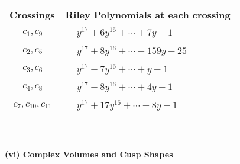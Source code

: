 \documentclass[1p]{elsarticle_modified}
\theoremstyle{definition}
\begin{document}
\begin{tabular}{m{50pt}|m{274pt}}
Crossings & \hspace{64pt}Riley Polynomials at each crossing \\
\hline $$\begin{aligned}c_{1},c_{9}\end{aligned}$$&$\begin{aligned}
&y^{17}+6 y^{16}+\cdots+7 y-1
\end{aligned}$\\
\hline $$\begin{aligned}c_{2},c_{5}\end{aligned}$$&$\begin{aligned}
&y^{17}+8 y^{16}+\cdots-159 y-25
\end{aligned}$\\
\hline $$\begin{aligned}c_{3},c_{6}\end{aligned}$$&$\begin{aligned}
&y^{17}-7 y^{16}+\cdots+y-1
\end{aligned}$\\
\hline $$\begin{aligned}c_{4},c_{8}\end{aligned}$$&$\begin{aligned}
&y^{17}-8 y^{16}+\cdots+4 y-1
\end{aligned}$\\
\hline $$\begin{aligned}c_{7},c_{10},c_{11}\end{aligned}$$&$\begin{aligned}
&y^{17}+17 y^{16}+\cdots-8 y-1
\end{aligned}$\\
\hline
\end{tabular}\\~\\
\newpage\flushleft \textbf{(vi) Complex Volumes and Cusp Shapes}
\end{document}
